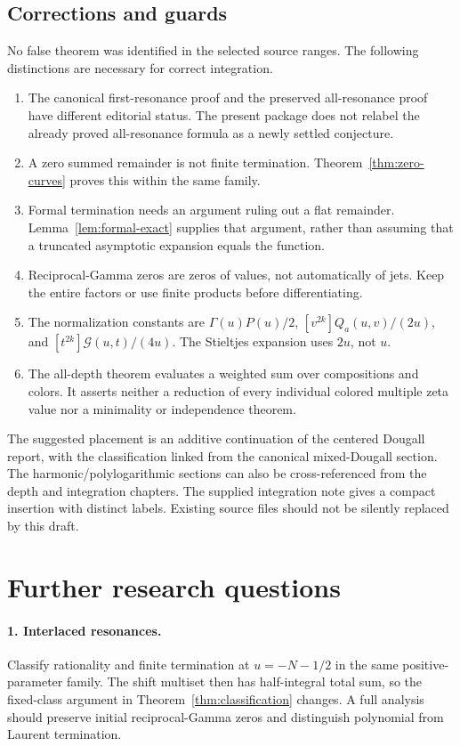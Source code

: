 \documentclass[11pt,a4paper]{article}
\numberwithin{equation}{section}
\theoremstyle{definition}\newtheorem{definition}[theorem]{Definition}
\theoremstyle{remark}\newtheorem{remark}[theorem]{Remark}
\newcommand{\Gcal}{\mathcal G}\newcommand{\Rcal}{\mathcal R}
\begin{document}
\subsection{Corrections and guards}
No false theorem was identified in the selected source ranges. The
following distinctions are necessary for correct integration.

\begin{enumerate}[leftmargin=*,itemsep=3pt]
\item The canonical first-resonance proof and the preserved all-resonance
proof have different editorial status. The present package does not
relabel the already proved all-resonance formula as a newly settled
conjecture.
\item A zero summed remainder is not finite termination.
Theorem~\ref{thm:zero-curves} proves this within the same family.
\item Formal termination needs an argument ruling out a flat remainder.
Lemma~\ref{lem:formal-exact} supplies that argument, rather than assuming
that a truncated asymptotic expansion equals the function.
\item Reciprocal-Gamma zeros are zeros of values, not automatically of
jets. Keep the entire factors or use finite products before differentiating.
\item The normalization constants are $\Gamma(u)P(u)/2$,
$[v^{2k}]Q_a(u,v)/(2u)$, and $[t^{2k}]\Gcal(u,t)/(4u)$.
The Stieltjes expansion uses $2u$, not $u$.
\item The all-depth theorem evaluates a weighted sum over compositions
and colors. It asserts neither a reduction of every individual colored
multiple zeta value nor a minimality or independence theorem.
\end{enumerate}

The suggested placement is an additive continuation of the centered
Dougall report, with the classification linked from the canonical
mixed-Dougall section. The harmonic/polylogarithmic sections can also be
cross-referenced from the depth and integration chapters. The supplied
integration note gives a compact insertion with distinct labels. Existing
source files should not be silently replaced by this draft.

\section{Further research questions}
\label{sec:further}
\paragraph{1. Interlaced resonances.}
Classify rationality and finite termination at $u=-N-1/2$ in the same
positive-parameter family. The shift multiset then has half-integral
total sum, so the fixed-class argument in
Theorem~\ref{thm:classification} changes. A full analysis should preserve
initial reciprocal-Gamma zeros and distinguish polynomial from Laurent
termination.
\end{document}
